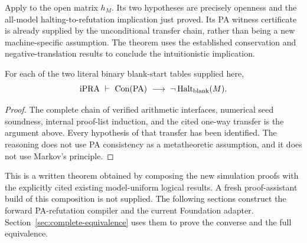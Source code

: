 Apply
to the open matrix $h_M$.  Its two hypotheses are precisely openness and
the all-model halting-to-refutation implication just proved.
Its PA witness certificate is already supplied by the unconditional
transfer chain, rather than being a new machine-specific assumption.
The theorem uses the established conservation and negative-translation
results to conclude the intuitionistic implication\cite{one-way-transfer}.

\begin{theorem}
For each of the two literal binary blank-start tables supplied here,
\[
 \mathrm{iPRA}\ \vdash\
 \operatorname{Con}(\mathrm{PA})\ \longrightarrow\
                   \neg\operatorname{Halt}_{\rm blank}(M).
\]
\end{theorem}
\begin{proof}
The complete chain of verified arithmetic interfaces, numerical seed
soundness, internal proof-list induction, and the cited one-way transfer
is the argument above.  Every hypothesis of that transfer has been
identified.  The reasoning does not use PA consistency as a metatheoretic
assumption, and it does not use Markov's principle.
\end{proof}

This is a written theorem obtained by composing the new simulation proofs
with the explicitly cited existing model-uniform logical results.  A fresh
proof-assistant build of this composition is not supplied.  The following
sections construct the forward PA-refutation compiler and the current
Foundation adapter.  Section~\ref{sec:complete-equivalence} uses them
to prove the converse and the full equivalence.
